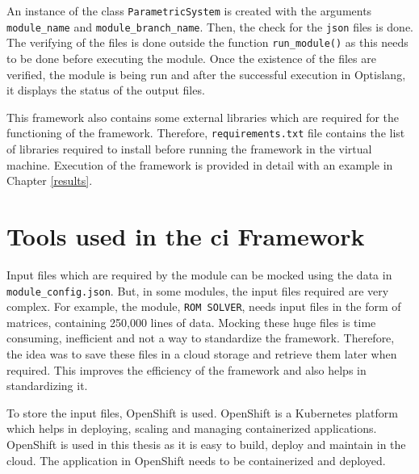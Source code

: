 An instance of the class \texttt{ParametricSystem} 
is created with the arguments \texttt{module\_name} and \texttt{module\_branch\_name}. Then, the check for the \texttt{\acrshort{json}} files is done. 
The verifying of the files is done outside the function \texttt{run\_module()} as this needs to be done before executing the module.
Once the existence of the files are verified, the module is being run and after the successful execution in Optislang, it displays the status of the output
files. 

This framework also contains some external libraries which are required for the functioning of the framework. Therefore, \texttt{requirements.txt} file contains the list of libraries
required to install before running the framework in the virtual machine. Execution of the framework is provided in detail with an example in Chapter \ref{results}.

\section{Tools used in the \acrshort{ci} Framework} \label{retrieve_input_files}
Input files which are required by the module can be mocked using the data in \texttt{module\_config.json}. But, in some modules, the input files required are very complex. For example, the module, \texttt{ROM SOLVER}, needs input files in the form of 
matrices, containing 250,000 lines of data. Mocking these huge files is time consuming, inefficient and not a way to standardize the framework. Therefore,
the idea was to save these files in a cloud storage and retrieve them later when required. This improves the efficiency of the framework and also helps in
standardizing it. 

To store the input files, OpenShift is used. OpenShift\cite{openshift} is a Kubernetes platform which helps in deploying, scaling and managing containerized applications. 
OpenShift is used in this thesis as it is easy to build, deploy and maintain in the cloud. The application in OpenShift needs to be containerized and deployed. 

